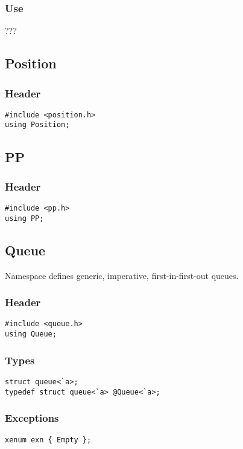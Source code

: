 \subsubsection*{Use}

???

\subsection{Position}

\subsubsection*{Header}
\begin{verbatim}
#include <position.h>
using Position;
\end{verbatim}

\subsection{PP}

\subsubsection*{Header}
\begin{verbatim}
#include <pp.h>
using PP;
\end{verbatim}

\subsection{Queue}

Namespace  defines generic, imperative, first-in-first-out
queues.

\subsubsection*{Header}
\begin{verbatim}
#include <queue.h>
using Queue;
\end{verbatim}

\subsubsection*{Types}
\begin{verbatim}
struct queue<`a>;
typedef struct queue<`a> @Queue<`a>;
\end{verbatim}

\subsubsection*{Exceptions}
\begin{verbatim}
xenum exn { Empty };
\end{verbatim}

